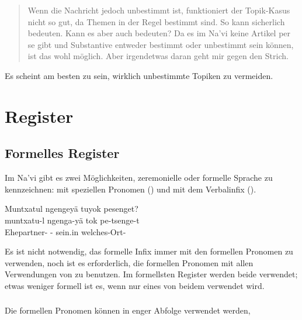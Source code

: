 \begin{quote}Wenn die Nachricht jedoch unbestimmt ist, funktioniert der Topik-Kasus nicht so gut, da Themen in der Regel bestimmt sind. So kann  sicherlich  bedeuten. Kann es aber auch  bedeuten? Da es im Na'vi keine Artikel per se gibt und Substantive entweder bestimmt oder unbestimmt sein können, ist das wohl möglich. Aber irgendetwas daran geht mir gegen den Strich.
\end{quote}

\noindent Es scheint am besten zu sein, wirklich unbestimmte Topiken zu vermeiden.

\section{Register}

\subsection{Formelles Register} Im Na'vi gibt es zwei Möglichkeiten, zeremonielle oder formelle Sprache zu kennzeichnen: mit speziellen Pronomen () und mit dem Verbalinfix  ().

\begin{interlin}
\glll Muntxatul ngengeyä tuyok pesenget? \\
   muntxatu-l ngenga-yä tok pe-tsenge-t \\
   Ehepartner- - sein.in welches-Ort-\\
\Ipawl{}
\end{interlin}

\noindent Es ist nicht notwendig, das formelle Infix  immer mit den formellen Pronomen zu verwenden, noch ist es erforderlich, die formellen Pronomen mit allen Verwendungen von  zu benutzen. Im formellsten Register werden beide verwendet; etwas weniger formell ist es, wenn nur eines von beidem verwendet wird.

\subsubsection{} Die formellen Pronomen können in enger Abfolge verwendet werden,  

